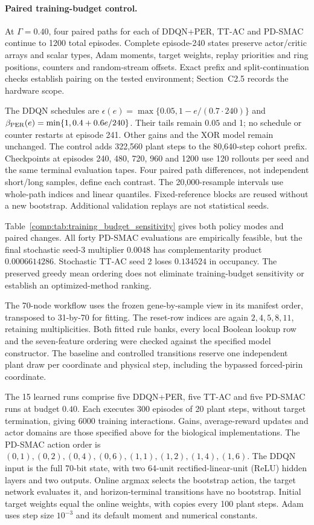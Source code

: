 \documentclass[11pt]{article}
\newcommand{\1}{\mathbf{1}}
\begin{document}
\paragraph{Paired training-budget control.}
At $\Gamma=0.40$, four paired paths for each of DDQN+PER, TT-AC and PD-SMAC continue to 1200 total episodes. Complete episode-240 states preserve actor/critic arrays and scalar types, Adam moments, target weights, replay priorities and ring positions, counters and random-stream offsets. Exact prefix and split-continuation checks establish pairing on the tested environment; Section~C2.5 records the hardware scope.

The DDQN schedules are $\epsilon(e)=\max\{0.05,1-e/(0.7\cdot240)\}$ and $\beta_{\rm PER}(e)=\min\{1,0.4+0.6e/240\}$. Their tails remain $0.05$ and 1; no schedule or counter restarts at episode 241. Other gains and the XOR model remain unchanged. The control adds 322,560 plant steps to the 80,640-step cohort prefix. Checkpoints at episodes 240, 480, 720, 960 and 1200 use 120 rollouts per seed and the same terminal evaluation tapes. Four paired path differences, not independent short/long samples, define each contrast. The 20,000-resample intervals use whole-path indices and linear quantiles. Fixed-reference blocks are reused without a new bootstrap. Additional validation replays are not statistical seeds.

Table~\ref{comp:tab:training_budget_sensitivity} gives both policy modes and paired changes. All forty PD-SMAC evaluations are empirically feasible, but the final stochastic seed-3 multiplier $0.0048$ has complementarity product $0.0006614286$. Stochastic TT-AC seed 2 loses $0.134524$ in occupancy. The preserved greedy mean ordering does not eliminate training-budget sensitivity or establish an optimized-method ranking.

The 70-node workflow uses the frozen gene-by-sample view in its manifest order, transposed to 31-by-70 for fitting. The reset-row indices are again $2,4,5,8,11$, retaining multiplicities. Both fitted rule banks, every local Boolean lookup row and the seven-feature ordering were checked against the specified model constructor. The baseline and controlled transitions reserve one independent plant draw per coordinate and physical step, including the bypassed forced-pirin coordinate. 

The 15 learned runs comprise five DDQN+PER, five TT-AC and five PD-SMAC runs at budget $0.40$. Each executes 300 episodes of 20 plant steps, without target termination, giving 6000 training interactions. Gains, average-reward updates and actor domains are those specified above for the biological implementations. The PD-SMAC action order is $(0,1),(0,2),(0,4),(0,6),(1,1),(1,2),(1,4),(1,6)$. The DDQN input is the full 70-bit state, with two 64-unit rectified-linear-unit (ReLU) hidden layers and two outputs. Online argmax selects the bootstrap action, the target network evaluates it, and horizon-terminal transitions have no bootstrap. Initial target weights equal the online weights, with copies every 100 plant steps. Adam uses step size $10^{-3}$ and its default moment and numerical constants.
\end{document}
